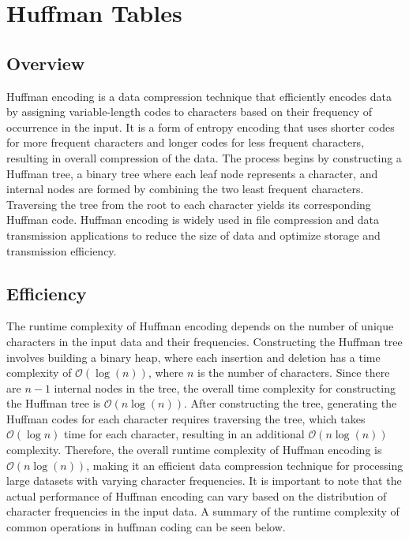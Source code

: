 \clearpage

\section*{Huffman Tables}

\subsection*{Overview}

Huffman encoding is a data compression technique that efficiently encodes data by assigning variable-length codes to characters based on their frequency of occurrence in the input. It is a form of 
entropy encoding that uses shorter codes for more frequent characters and longer codes for less frequent characters, resulting in overall compression of the data. The process begins by constructing 
a Huffman tree, a binary tree where each leaf node represents a character, and internal nodes are formed by combining the two least frequent characters. Traversing the tree from the root to each 
character yields its corresponding Huffman code. Huffman encoding is widely used in file compression and data transmission applications to reduce the size of data and optimize storage and transmission 
efficiency.

\subsection*{Efficiency}

The runtime complexity of Huffman encoding depends on the number of unique characters in the input data and their frequencies. Constructing the Huffman tree involves building a binary heap, where each 
insertion and deletion has a time complexity of $\mathcal{O}(\log{(n)})$, where $n$ is the number of characters. Since there are $n-1$ internal nodes in the tree, the overall time complexity for 
constructing the Huffman tree is $\mathcal{O}(n\log{(n)})$. After constructing the tree, generating the Huffman codes for each character requires traversing the tree, which takes $\mathcal{O}(\log{n})$ 
time for each character, resulting in an additional $\mathcal{O}(n\log{(n)})$ complexity. Therefore, the overall runtime complexity of Huffman encoding is $\mathcal{O}(n\log{(n)})$, making it an efficient 
data compression technique for processing large datasets with varying character frequencies. It is important to note that the actual performance of Huffman encoding can vary based on the distribution of 
character frequencies in the input data. A summary of the runtime complexity of common operations in huffman coding can be seen below.

